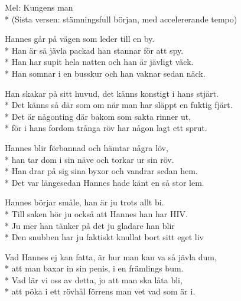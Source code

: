 \begin{SongText}[Hannes]
    \begin{SongInfo}
        Mel: Kungens man\\*%
        (Sista versen: stämningsfull början, med accelererande tempo)
    \end{SongInfo}
    \begin{SongVerse}
        Hannes går på vägen som leder till en by.\\*%
        Han är så jävla packad han stannar för att spy.\\*%
        Han har supit hela natten och han är jävligt väck.\\*%
        Han somnar i en busskur och han vaknar sedan näck.
    \end{SongVerse}
    \begin{SongVerse}
        Han skakar på sitt huvud, det känns konstigt i hans stjärt.\\*%
        Det känns så där som om när man har släppt en fuktig fjärt.\\*%
        Det är någonting där bakom som sakta rinner ut,\\*%
        för i hans fordom trånga röv har någon lagt ett sprut.
    \end{SongVerse}
    \begin{SongVerse}
        Hannes blir förbannad och hämtar några löv,\\*%
        han tar dom i sin näve och torkar ur sin röv.\\*%
        Han drar på sig sina byxor och vandrar sedan hem.\\*%
        Det var längesedan Hannes hade känt en så stor lem.
    \end{SongVerse}
    \begin{SongVerse}
        Hannes börjar småle, han är ju trots allt bi.\\*%
        Till saken hör ju också att Hannes han har HIV.\\*%
        Ju mer han tänker på det ju gladare han blir\\*%
        Den snubben har ju faktiskt knullat bort sitt eget liv
    \end{SongVerse}
    \begin{SongVerse}
        Vad Hannes ej kan fatta, är hur man kan va så jävla dum,\\*%
        att man baxar in sin penis, i en främlings bum.\\*%
        Vad lär vi oss av detta, jo att man ska låta bli,\\*%
        att pöka i ett rövhål förrens man vet vad som är i.
    \end{SongVerse}
\end{SongText}
